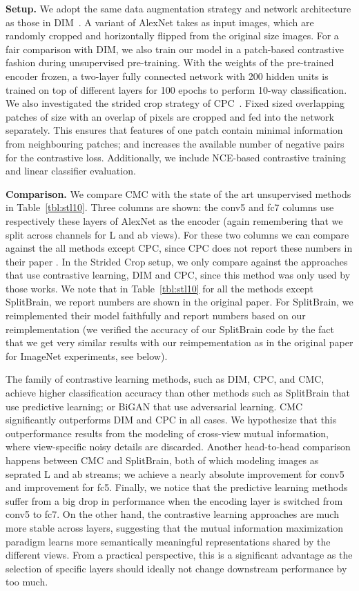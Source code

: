 \documentclass[10pt,twocolumn,letterpaper]{article}
\newcommand{\header}[1]{\vspace{0.05in}\noindent\textbf{#1}}
\newcommand{\citep}[1]{\cite{#1}}
\begin{document}
\header{Setup.} We adopt the same  data augmentation strategy and network architecture as those in DIM~\citep{hjelm2018learning}. A variant of AlexNet takes as input  images, which are randomly cropped and horizontally flipped from the original  size images. For a fair comparison with DIM, we also train our model in a patch-based contrastive fashion during unsupervised pre-training. With the weights of the pre-trained encoder frozen, a two-layer fully connected network with 200 hidden units is trained on top of different layers for 100 epochs to perform 10-way classification. We also investigated the strided crop strategy of CPC~\citep{oord2018representation}. Fixed sized overlapping patches of size  with an overlap of  pixels are cropped and fed into the network separately. This ensures that features of one patch contain minimal information from neighbouring patches; and increases the available number of negative pairs for the contrastive loss. Additionally, we include NCE-based contrastive training and linear classifier evaluation.

\header{Comparison.} We compare CMC with the state of the art unsupervised methods in Table~\ref{tbl:stl10}. Three columns are shown: the conv5 and fc7 columns use respectively these layers of AlexNet as the encoder (again remembering that we split across channels for L and ab views). For these two columns we can compare against the all methods except CPC, since CPC does not report these numbers in their paper \citep{hjelm2018learning}. In the Strided Crop setup, we only compare against the approaches that use contrastive learning, DIM and CPC, since this method was only used by those works. We note that in Table~\ref{tbl:stl10} for all the methods except SplitBrain, we report numbers are shown in the original paper. For SplitBrain, we reimplemented their model faithfully and report numbers based on our reimplementation (we verified the accuracy of our SplitBrain  code by the fact that we get very similar results with our reimpementation as in the original paper \citep{zhang2017split} for ImageNet experiments, see below).

The family of contrastive learning methods, such as DIM, CPC, and CMC, achieve higher classification accuracy than other methods such as SplitBrain that use predictive learning; or BiGAN that use adversarial learning. CMC significantly outperforms DIM and CPC in all cases. We hypothesize that this outperformance results from the modeling of cross-view mutual information, where view-specific noisy details are discarded. Another head-to-head comparison happens between CMC and SplitBrain, both of which modeling images as seprated L and ab streams; we achieve a nearly  absolute improvement for conv5 and  improvement for fc5. Finally, we notice that the predictive learning methods suffer from a big drop in performance when the encoding layer is switched from conv5 to fc7. On the other hand, the contrastive learning approaches are much more stable across layers, suggesting that the mutual information maximization paradigm learns more semantically meaningful representations shared by the different views. From a practical perspective, this is a significant advantage as the selection of specific layers should ideally not change downstream performance by too much.
\end{document}
